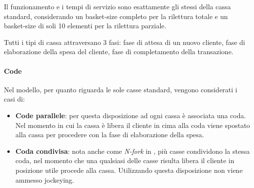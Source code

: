 \begin{enumerate}
Il funzionamento e i tempi di servizio sono esattamente gli stessi della cassa standard, considerando un basket-size completo per la rilettura totale e un basket-size di soli 10 elementi per la rilettura parziale.
\end{enumerate}

Tutti i tipi di cassa attraversano 3 fasi: fase di attesa di un nuovo cliente, fase di elaborazione della spesa del cliente, fase di completamento della transazione.

\paragraph{Code}
Nel modello, per quanto riguarda le sole casse standard, vengono considerati i casi di:

\begin{itemize}
\item \textbf{Code parallele}: per questa disposizione ad ogni cassa è
  associata una coda. Nel momento in cui la cassa è libera il cliente in
  cima alla coda viene spostato alla cassa per procedere con la fase
  di elaborazione della spesa.
\item \textbf{Coda condivisa}: nota anche come \textit{N-fork} in \cite{yanagisawa2011methods}, più casse condividono la stessa coda, nel momento che una qualsiasi delle casse risulta libera il cliente in posizione utile procede alla cassa. Utilizzando questa disposizione non viene ammesso jockeying.
\end{itemize}

